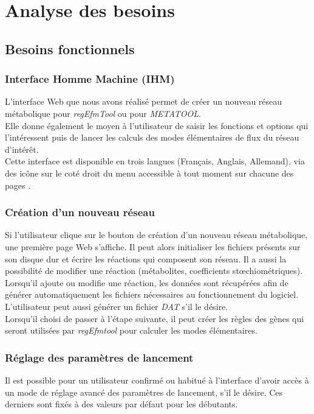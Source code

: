 \section{Analyse des besoins}

\subsection{Besoins fonctionnels}

\subsubsection{Interface Homme Machine (IHM)}
L'interface Web que nous avons réalisé permet de créer un nouveau réseau métabolique pour \textit{regEfmTool} ou pour \emph{METATOOL}.\\
Elle donne également le moyen à l'utilisateur de saisir les fonctions et options qui l'intéressent puis de lancer les calculs des modes élémentaires de flux du réseau d'intérêt.\\ 
Cette interface est disponible en trois langues (Français, Anglais, Allemand), via des icône sur le coté droit du menu accessible à tout moment sur chacune des pages .

\subsubsection{Création d'un nouveau réseau}
Si l'utilisateur clique sur le bouton de création d'un nouveau réseau métabolique, une première page Web s'affiche. Il peut alors initialiser les fichiers présents sur son disque dur et écrire les réactions qui composent son réseau. Il a aussi la possibilité de modifier une réaction (métabolites, coefficients stœchiométriques). Lorsqu'il ajoute ou modifie une réaction, les données sont récupérées afin de générer automatiquement les fichiers nécessaires au fonctionnement du logiciel.
L'utilisateur peut aussi générer un fichier \emph{DAT} s'il le désire.\\
Lorsqu'il choisi de passer à l'étape suivante, il peut créer les règles des gènes qui seront utilisées par \emph{regEfmtool} pour calculer les modes élémentaires.

\subsubsection{Réglage des paramètres de lancement}
Il est possible pour un utilisateur confirmé ou habitué à l'interface d'avoir accès à un mode de réglage avancé des paramètres de lancement, s'il le désire. Ces derniers sont fixés à des valeurs par défaut pour les débutants. 

